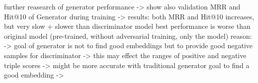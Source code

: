 further reasearch of generator performance 
-> show also validation MRR and Hit@10 of Generator during training
-> results:
both MRR and Hit@10 increases, but very slow + slower than discriminator model
best performance is worse than original model (pre-trained, without adversarial training, only the model)
reason:
-> goal of generator is not to find good embeddings but to provide good negative samples for discriminator
-> this may effect the ranges of positive and negative triple scores
-> might be more accurate with traditional generator goal to find a good embedding
->  

